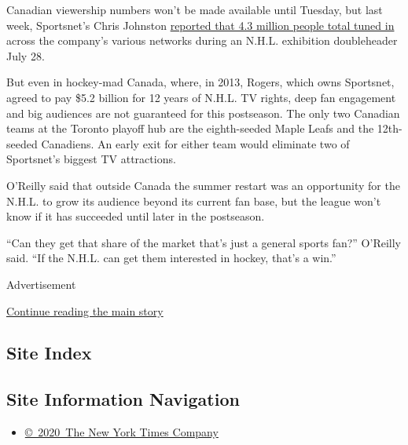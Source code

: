 Canadian viewership numbers won't be made available until Tuesday, but
last week, Sportsnet's Chris Johnston
\href{https://twitter.com/SportsnetPR/status/1288572556887429120}{reported
that 4.3 million people total tuned in} across the company's various
networks during an N.H.L. exhibition doubleheader July 28.

But even in hockey-mad Canada, where, in 2013, Rogers, which owns
Sportsnet, agreed to pay \$5.2 billion for 12 years of N.H.L. TV rights,
deep fan engagement and big audiences are not guaranteed for this
postseason. The only two Canadian teams at the Toronto playoff hub are
the eighth-seeded Maple Leafs and the 12th-seeded Canadiens. An early
exit for either team would eliminate two of Sportsnet's biggest TV
attractions.

O'Reilly said that outside Canada the summer restart was an opportunity
for the N.H.L. to grow its audience beyond its current fan base, but the
league won't know if it has succeeded until later in the postseason.

``Can they get that share of the market that's just a general sports
fan?'' O'Reilly said. ``If the N.H.L. can get them interested in hockey,
that's a win.''

Advertisement

\protect\hyperlink{after-bottom}{Continue reading the main story}

\hypertarget{site-index}{%
\subsection{Site Index}\label{site-index}}

\hypertarget{site-information-navigation}{%
\subsection{Site Information
Navigation}\label{site-information-navigation}}

\begin{itemize}
\tightlist
\item
  \href{https://help.nytimes.com/hc/en-us/articles/115014792127-Copyright-notice}{©~2020~The
  New York Times Company}
\end{itemize}

